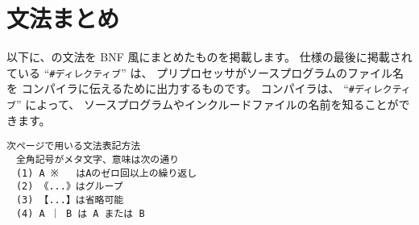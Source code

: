 % 
%
\chapter{\cmml 文法まとめ}

以下に、\cmml の文法を BNF 風にまとめたものを掲載します。
仕様の最後に掲載されている ``\verb/#ディレクティブ/'' は、
プリプロセッサがソースプログラムのファイル名を
\cmm コンパイラに伝えるために出力するものです。
\cmm コンパイラは、
``\verb/#ディレクティブ/'' によって、
ソースプログラムやインクルードファイルの名前を知ることができます。

\begin{verbatim}
次ページで用いる文法表記方法
　全角記号がメタ文字、意味は次の通り
　(1) A ※   はAのゼロ回以上の繰り返し
　(2) 《...》はグループ
　(3) 【...】は省略可能
　(4) A ｜ B は A または B
\end{verbatim}

